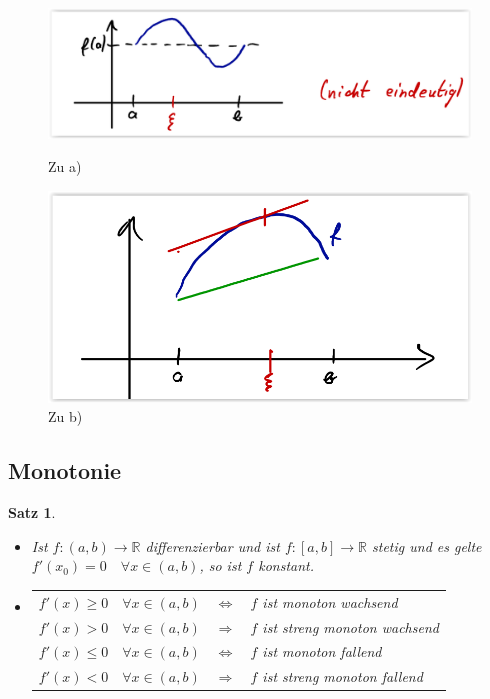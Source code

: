 \documentclass[12pt,a4paper]{report}%
\newtheorem{satz}{Satz}[section]
\numberwithin{equation}{section}
\newcommand{\R}{\mathbb{R}} %
\numberwithin{equation}{subsection}
\begin{document}
  \begin{figure}[H] 
		\centering
		\begin{minipage}{.5\textwidth}
		  \centering
		  \includegraphics[width=0.8\linewidth]{mws_rolle.png}
		  \caption{Zu a) \protect\cite{HM12}}
		  \label{fig:mws_rolle}
		\end{minipage}%
		\begin{minipage}{.5\textwidth}
		  \centering
		  \includegraphics[width=0.8\linewidth]{mws_1.png}
		  \caption{Zu b) \protect\cite{HM12}}
		  \label{fig:funkt_sinh}
		\end{minipage}
  \end{figure}
		
  \subsection{Monotonie}	
  \begin{satz}$\;$ \newline
  \vspace{-0.5cm}
    \begin{itemize}
      \item[a) ] Ist $f:(a,b)\rightarrow \R$ differenzierbar und ist $f:[a,b]\rightarrow \R$ stetig und es gelte $f'(x_0) = 0 \quad \forall x \in (a,b)$, so ist $f$ konstant.
      \item[b) ] 
      \begin{tabular}{l c l} 
        $f'(x) \geq 0 \quad \forall x \in (a,b)$ & $\Leftrightarrow$ & $f$ ist monoton wachsend \\
        $f'(x) > 0 \quad \forall x \in (a,b)$ & $\Rightarrow$ & $f$ ist streng monoton wachsend \\
        $f'(x) \leq 0 \quad \forall x \in (a,b)$ & $\Leftrightarrow$ & $f$ ist monoton fallend \\
        $f'(x) < 0 \quad \forall x \in (a,b)$ & $\Rightarrow$ & $f$ ist streng monoton fallend \\
      \end{tabular}
    \end{itemize}
  \end{satz}	
  
\end{document}
